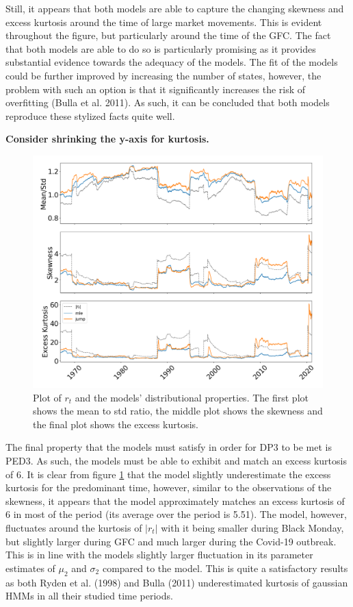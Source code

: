 Still, it appears that both models are able to capture the changing skewness and excess kurtosis around the time of large market movements. This is evident throughout the figure, but particularly around the time of the GFC. The fact that both models are able to do so is particularly promising as it provides substantial evidence towards the adequacy of the models. The fit of the models could be further improved by increasing the number of states, however, the problem with such an option is that it significantly increases the risk of overfitting (Bulla et al. 2011). As such, it can be concluded that both models reproduce these stylized facts quite well.

\textbf{Consider shrinking the y-axis for kurtosis.}
\begin{figure}[H] 
    \centering
    \includegraphics[width=1.0\textwidth]{analysis/stylized_facts/images/moments_bulla_abs.png}
    \caption[Plot of $r_t$ and the models' distributional properties]{Plot of $r_t$ and the models' distributional properties. The first plot shows the mean to std ratio, the middle plot shows the skewness and the final plot shows the excess kurtosis.}
    \label{fig:stylized_facts_moments_bulla_abs} 
\end{figure}

The final property that the models must satisfy in order for DP3 to be met is PED3. As such, the models must be able to exhibit and match an excess kurtosis of 6. It is clear from figure \ref{fig:stylized_facts_moments_bulla_abs} that the \mle model slightly underestimate the excess kurtosis for the predominant time, however, similar to the observations of the skewness, it appears that the \mle model approximately matches an excess kurtosis of 6 in most of the period (its average over the period is 5.51). The \jump model, however, fluctuates around the kurtosis of $|r_t|$ with it being smaller during Black Monday, but slightly larger during GFC and much larger during the Covid-19 outbreak. This is in line with the \jump models slightly larger fluctuation in its parameter estimates of $\mu_2$ and $\sigma_2$ compared to the \mle model. This is quite a satisfactory results as both Ryden et al. (1998) and Bulla (2011) underestimated kurtosis of gaussian HMMs in all their studied time periods.

